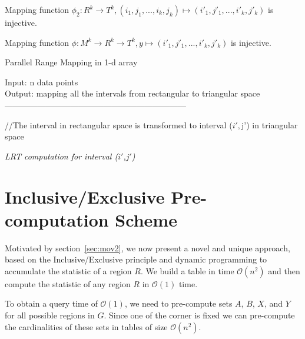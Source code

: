 \documentclass[AMA,LATO1COL]{WileyNJD-v2}
\newcommand\bigo{\mathcal O}
\begin{document}
\begin{lemma}
Mapping function $\phi_2:   R^k \rightarrow  T^k, (i_1,j_1,...,i_k,j_k) \mapsto (i'_1,j'_1,...,i'_k,j'_k)$ is injective.
\end{lemma}

\begin{corollary}
Mapping function $\phi:   M^k \rightarrow R^k \rightarrow  T^k,y \mapsto (i'_1,j'_1,...,i'_k,j'_k)$ is injective.
\end{corollary}



\begin{algorithm}[t!]
\label{RM}
\caption{ Parallel Range Mapping in 1-d array}\label{RM}
Input:  n data points \\
Output: mapping all the intervals from rectangular to triangular space\\
------------------------------------------------------------------ \\
\begin{algorithmic}[1]
\State //The interval  in rectangular space is transformed to interval ($i',$j') in triangular space
\Else
{}

\EndIf
\EndIf
\State \textit {LRT computation for interval (${i\prime}$,${j\prime}$)}
\EndFor
\EndFor
\end{algorithmic}
\end{algorithm}

\section {Inclusive/Exclusive Pre-computation Scheme} \label{DM}

Motivated by section~\ref{sec:mov2}, we now present a novel and unique approach, based on the Inclusive/Exclusive principle and
dynamic programming to accumulate the statistic of a region $R$. We build a table in time $\bigo(n^2)$ and then compute the statistic of any region $R$ in $\bigo(1)$ time.

To obtain a query time of $\bigo(1)$, we need to pre-compute sets $A$, $B$, $X$, and $Y$ for all possible regions in $G$. Since one of the corner is fixed we can pre-compute the cardinalities of these sets in tables of size $\bigo(n^2)$.
\end{document}
